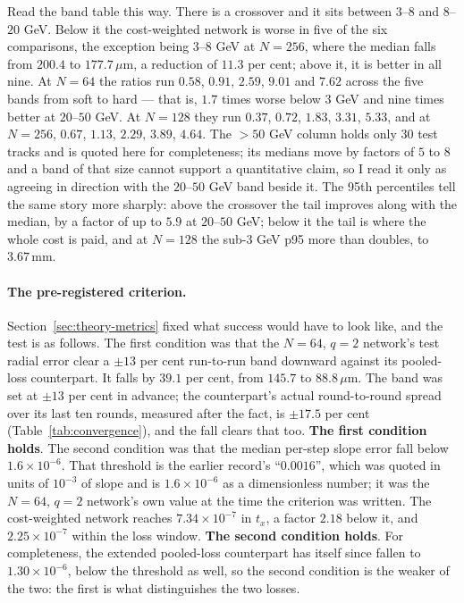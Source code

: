 \documentclass[11pt,a4paper]{article}
\newcommand{\um}{\ensuremath{\,\mu\mathrm{m}}}
\newcommand{\mm}{\ensuremath{\,\mathrm{mm}}}
\begin{document}
Read the band table this way. There is a crossover and it sits between $3$--$8$
and $8$--$20$ GeV. Below it the cost-weighted network is worse in five of the
six comparisons, the exception being $3$--$8$ GeV at $N = 256$, where the
median falls from $200.4$ to $177.7\um$, a reduction of $11.3$ per cent; above it, it is better in all nine. At $N = 64$ the ratios run
$0.58$, $0.91$, $2.59$, $9.01$ and $7.62$ across the five bands from soft to
hard --- that is, $1.7$ times worse below $3$ GeV and nine times better at
$20$--$50$ GeV. At $N = 128$ they run $0.37$, $0.72$, $1.83$, $3.31$, $5.33$,
and at $N = 256$, $0.67$, $1.13$, $2.29$, $3.89$, $4.64$. The $>50$ GeV column
holds only $30$ test tracks and is quoted here for completeness; its medians
move by factors of $5$ to $8$ and a band of that size cannot support a
quantitative claim, so I read it only as agreeing in direction with the
$20$--$50$ GeV band beside it. The 95th percentiles tell the same story more
sharply: above the crossover the tail improves along with the median, by a
factor of up to $5.9$ at $20$--$50$ GeV; below it the tail is where the whole
cost is paid, and at $N = 128$ the sub-$3$ GeV p95 more than doubles, to
$3.67\mm$.

\paragraph{The pre-registered criterion.} Section~\ref{sec:theory-metrics}
fixed what success would have to look like, and the test is as follows. The
first condition was that the $N = 64$, $q = 2$ network's test radial error clear
a $\pm 13$ per cent run-to-run band downward against its pooled-loss
counterpart. It falls by $39.1$ per cent, from $145.7$ to $88.8\um$. The band
was set at $\pm 13$ per cent in advance; the counterpart's actual round-to-round
spread over its last ten rounds, measured after the fact, is $\pm 17.5$ per cent
(Table~\ref{tab:convergence}), and the fall clears that too. \textbf{The first
condition holds}. The second condition was that the median per-step slope error
fall below $1.6\times10^{-6}$. That threshold is the earlier record's
``$0.0016$'', which was quoted in units of $10^{-3}$ of slope and is
$1.6\times10^{-6}$ as a dimensionless number; it was the $N = 64$, $q = 2$
network's own value at the time the criterion was written. The cost-weighted
network reaches $7.34\times10^{-7}$ in $t_x$, a factor $2.18$ below it, and
$2.25\times10^{-7}$ within the loss window. \textbf{The second condition
holds}. For completeness, the extended pooled-loss counterpart has itself since
fallen to $1.30\times10^{-6}$, below the threshold as well, so the second
condition is the weaker of the two: the first is what distinguishes the two
losses.
\end{document}
